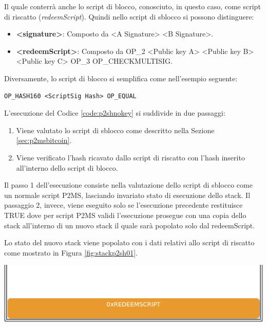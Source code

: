 Il quale conterrà anche lo script di blocco, conosciuto, in questo caso, come script di riscatto ({\it redeemScript\/}). Quindi nello script di sblocco si possono distinguere:
\begin{itemize}
  \item {\bf <signature>\/}: Composto da <A Signature> <B Signature>.
  \item {\bf <redeemScript>\/}: Composto da OP\_2 <Public key A> <Public key B> <Public key C> OP\_3 OP\_CHECKMULTISIG.
\end{itemize}

Diversamente, lo script di blocco si semplifica come nell’esempio seguente:
\begin{lstlisting}[language=bitcoinscript, label={code:p2shlock}, caption={Script P2SH di blocco.}]
OP_HASH160 <ScriptSig Hash> OP_EQUAL
\end{lstlisting}

L’esecuzione del Codice \ref{code:p2shnokey} si suddivide in due passaggi:

\begin{enumerate}
  \item Viene valutato lo script di sblocco come descritto nella Sezione \ref{sec:p2msbitcoin}.
  \item Viene verificato l'hash ricavato dallo script di riscatto con l’hash inserito all’interno dello script di blocco.
\end{enumerate}

Il passo 1 dell’esecuzione consiste nella valutazione dello script di sblocco come un normale script P2MS, lasciando invariato stato di esecuzione dello stack.
Il passaggio 2, invece, viene eseguito solo se l’esecuzione precedente restituisce TRUE dove per script P2MS validi l’esecuzione prosegue con una copia dello stack all’interno di un nuovo stack il quale sarà popolato solo dal redeemScript.

Lo stato del nuovo stack viene popolato con i dati relativi allo script di riscatto come mostrato in Figura \ref{fig:stackp2sh01}.

{\centering
\vspace{15pt}
\includegraphics[scale=0.35]{images/script/p2sh/1.png}
\vspace{10pt}
\par}


